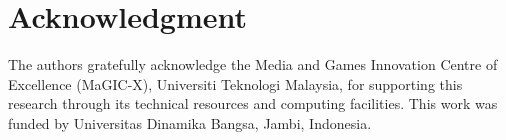 \documentclass[a4paper,fleqn]{cas-dc}
\theoremstyle{plain}
\theoremstyle{remark}
\begin{document}


\section*{Acknowledgment}
The authors gratefully acknowledge the Media and Games Innovation Centre of Excellence
(MaGIC-X), Universiti Teknologi Malaysia, for supporting this research through its
technical resources and computing facilities. This work was funded by Universitas
Dinamika Bangsa, Jambi, Indonesia.



\end{document}
